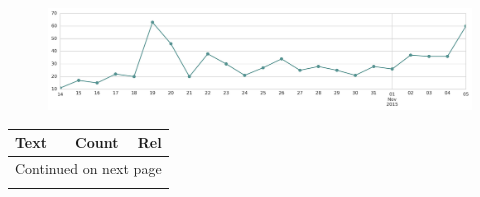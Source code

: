 \begin{figure}[htbp!]
    \centering
    \includegraphics[width=\textwidth]{twitter_all/report_images/topic-03-timeseries.jpg}
\end{figure}

\begin{longtable}{p{12.5cm}rr}
\toprule
Text & Count & Rel \\
\midrule
\endhead
\midrule
\multicolumn{3}{r}{{Continued on next page}} \\
\midrule
\endfoot


\end{longtable}
